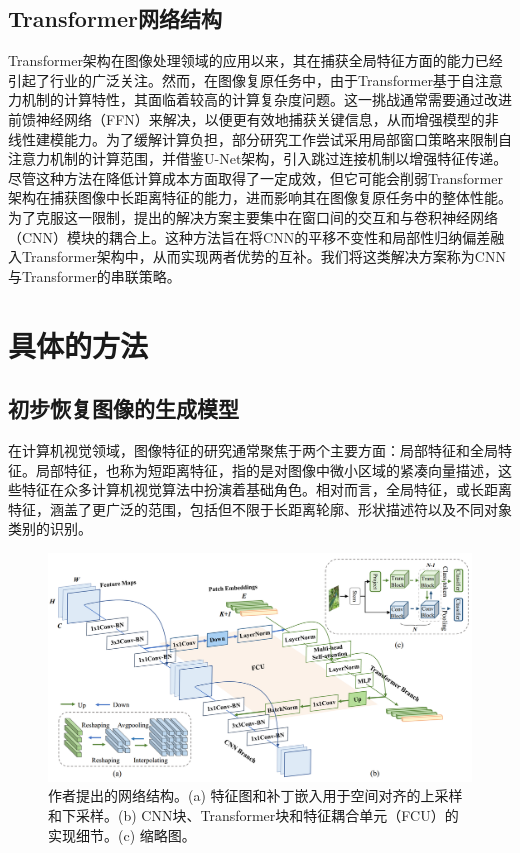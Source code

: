 \documentclass[a4paper]{ctexart}
\begin{document}
	\subsection{Transformer网络结构}
	
	Transformer架构\cite{vaswani2017attention}在图像处理领域的应用以来\cite{dosovitskiy2020image}，其在捕获全局特征方面的能力已经引起了行业的广泛关注。然而，在图像复原任务中，由于Transformer基于自注意力机制的计算特性，其面临着较高的计算复杂度问题。这一挑战通常需要通过改进前馈神经网络（FFN）来解决，以便更有效地捕获关键信息，从而增强模型的非线性建模能力\cite{wang2022ultrahighdefinition}。为了缓解计算负担，部分研究工作尝试采用局部窗口策略来限制自注意力机制的计算范围，并借鉴U-Net架构，引入跳过连接机制以增强特征传递\cite{wang2021uformer}。尽管这种方法在降低计算成本方面取得了一定成效，但它可能会削弱Transformer架构在捕获图像中长距离特征的能力，进而影响其在图像复原任务中的整体性能。为了克服这一限制，提出的解决方案\cite{chen2023cross}主要集中在窗口间的交互和与卷积神经网络（CNN）模块的耦合上。这种方法旨在将CNN的平移不变性和局部性归纳偏差融入Transformer架构中，从而实现两者优势的互补。我们将这类解决方案称为CNN与Transformer的串联策略。
	
	\section{具体的方法}
	
	\subsection{初步恢复图像的生成模型}
	
	在计算机视觉领域，图像特征的研究通常聚焦于两个主要方面：局部特征和全局特征。局部特征，也称为短距离特征，指的是对图像中微小区域的紧凑向量描述，这些特征在众多计算机视觉算法中扮演着基础角色\cite{jain1991unsupervised, lowe2004distinctive, ojala2002multiresolution}。相对而言，全局特征，或长距离特征，涵盖了更广泛的范围，包括但不限于长距离轮廓\cite{lisin2005combining}、形状描述符以及不同对象类别的识别。
	
	\begin{figure}[htb]
		\centering 
		\includegraphics[width=0.9\columnwidth]{picture/LLIE/Conformer/the proposed Conformer}
		\caption{
			\label{fig: Conformer} 
			作者\cite{peng2021conformer}提出的网络结构。(a) 特征图和补丁嵌入用于空间对齐的上采样和下采样。(b) CNN块、Transformer块和特征耦合单元（FCU）的实现细节。(c) 缩略图。 
		}
	\end{figure}
	
\end{document}
